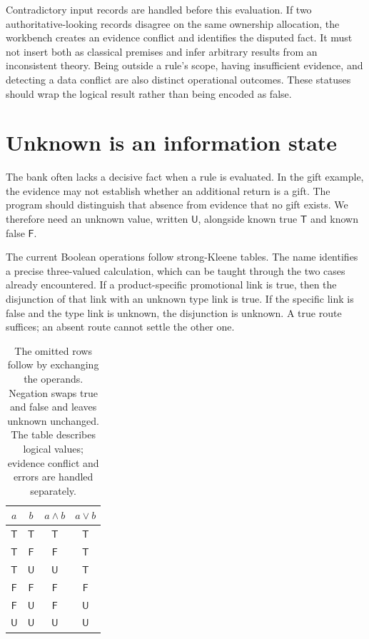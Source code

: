 \documentclass[12pt,a4paper,oneside,openany]{book}
\newcommand{\True}{\mathsf{T}}
\newcommand{\False}{\mathsf{F}}
\newcommand{\Unknown}{\mathsf{U}}
\begin{document}
Contradictory input records are handled before this evaluation. If two
authoritative-looking records disagree on the same ownership allocation, the
workbench creates an evidence conflict and identifies the disputed fact. It must
not insert both as classical premises and infer arbitrary results from an
inconsistent theory. Being outside a rule's scope, having insufficient evidence,
and detecting a data conflict are also distinct operational outcomes. These
statuses should wrap the logical result rather than being encoded as false.

\section{Unknown is an information state}
\label{merge:M03:05}

\label{sec:proof-unknown}
The bank often lacks a decisive fact when a rule is evaluated. In the gift
example, the evidence may not establish whether an additional return is a gift.
The program should distinguish that absence from evidence that no gift exists.
We therefore need an unknown value, written $\Unknown$, alongside known true
$\True$ and known false $\False$.

The current Boolean operations follow strong-Kleene tables. The name identifies
a precise three-valued calculation, which can be taught through the two cases
already encountered. If a product-specific promotional link is true, then the
disjunction of that link with an unknown type link is true. If the specific
link is false and the type link is unknown, the disjunction is unknown. A true
route suffices; an absent route cannot settle the other one.

\begin{table}[H]
\centering
\begin{tabular}{cc|cc}
\toprule
$a$ & $b$ & $a\land b$ & $a\lor b$\\
\midrule
$\True$ & $\True$ & $\True$ & $\True$\\
$\True$ & $\False$ & $\False$ & $\True$\\
$\True$ & $\Unknown$ & $\Unknown$ & $\True$\\
$\False$ & $\False$ & $\False$ & $\False$\\
$\False$ & $\Unknown$ & $\False$ & $\Unknown$\\
$\Unknown$ & $\Unknown$ & $\Unknown$ & $\Unknown$\\
\bottomrule
\end{tabular}
\caption{The omitted rows follow by exchanging the operands. Negation swaps
true and false and leaves unknown unchanged. The table describes logical values;
evidence conflict and errors are handled separately.}
\label{tab:kleene}
\end{table}
\end{document}

